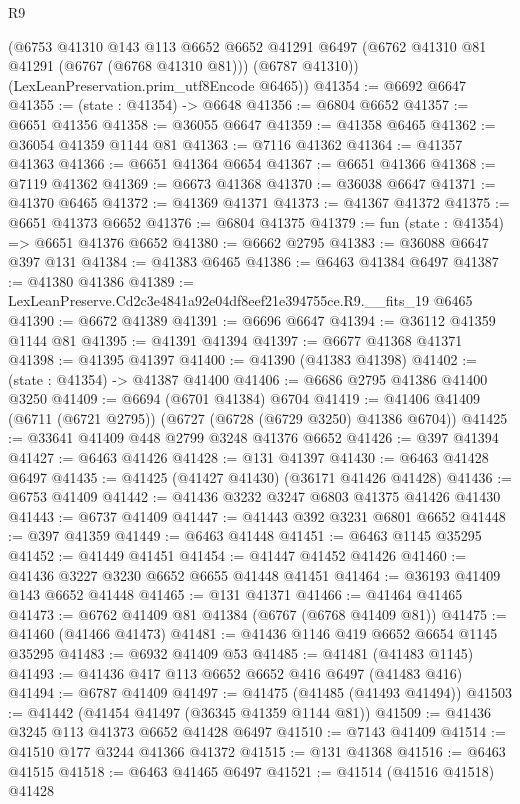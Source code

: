 \begin{lexlean}{R9}
\begin{coremodule}
      (@6753
        @41310
        @143
        @113
        @6652
        @6652
        @41291
        @6497
        (@6762 @41310 @81 @41291 (@6767 (@6768 @41310 @81)))
        (@6787 @41310))
      (LexLeanPreservation.prim_utf8Encode @6465))
@41354 := @6692 @6647
@41355 := (state : @41354) -> @6648
@41356 := @6804 @6652
@41357 := @6651 @41356
@41358 := @36055 @6647
@41359 := @41358 @6465
@41362 := @36054 @41359 @1144 @81
@41363 := @7116 @41362
@41364 := @41357 @41363
@41366 := @6651 @41364 @6654
@41367 := @6651 @41366
@41368 := @7119 @41362
@41369 := @6673 @41368
@41370 := @36038 @6647
@41371 := @41370 @6465
@41372 := @41369 @41371
@41373 := @41367 @41372
@41375 := @6651 @41373 @6652
@41376 := @6804 @41375
@41379 := fun (state : @41354) => @6651 @41376 @6652
@41380 := @6662 @2795
@41383 := @36088 @6647 @397 @131
@41384 := @41383 @6465
@41386 := @6463 @41384 @6497
@41387 := @41380 @41386
@41389 := LexLeanPreserve.Cd2c3e4841a92e04df8eef21e394755ce.R9.__fits_19 @6465
@41390 := @6672 @41389
@41391 := @6696 @6647
@41394 := @36112 @41359 @1144 @81
@41395 := @41391 @41394
@41397 := @6677 @41368 @41371
@41398 := @41395 @41397
@41400 := @41390 (@41383 @41398)
@41402 := (state : @41354) -> @41387 @41400
@41406 := @6686 @2795 @41386 @41400 @3250
@41409 := @6694 (@6701 @41384) @6704
@41419 := @41406 @41409 (@6711 (@6721 @2795)) (@6727 (@6728 (@6729 @3250) @41386 @6704))
@41425 := @33641 @41409 @448 @2799 @3248 @41376 @6652
@41426 := @397 @41394
@41427 := @6463 @41426
@41428 := @131 @41397
@41430 := @6463 @41428 @6497
@41435 := @41425 (@41427 @41430) (@36171 @41426 @41428)
@41436 := @6753 @41409
@41442 := @41436 @3232 @3247 @6803 @41375 @41426 @41430
@41443 := @6737 @41409
@41447 := @41443 @392 @3231 @6801 @6652
@41448 := @397 @41359
@41449 := @6463 @41448
@41451 := @6463 @1145 @35295
@41452 := @41449 @41451
@41454 := @41447 @41452 @41426
@41460 := @41436 @3227 @3230 @6652 @6655 @41448 @41451
@41464 := @36193 @41409 @143 @6652 @41448
@41465 := @131 @41371
@41466 := @41464 @41465
@41473 := @6762 @41409 @81 @41384 (@6767 (@6768 @41409 @81))
@41475 := @41460 (@41466 @41473)
@41481 := @41436 @1146 @419 @6652 @6654 @1145 @35295
@41483 := @6932 @41409 @53
@41485 := @41481 (@41483 @1145)
@41493 := @41436 @417 @113 @6652 @6652 @416 @6497 (@41483 @416)
@41494 := @6787 @41409
@41497 := @41475 (@41485 (@41493 @41494))
@41503 := @41442 (@41454 @41497 (@36345 @41359 @1144 @81))
@41509 := @41436 @3245 @113 @41373 @6652 @41428 @6497
@41510 := @7143 @41409
@41514 := @41510 @177 @3244 @41366 @41372
@41515 := @131 @41368
@41516 := @6463 @41515
@41518 := @6463 @41465 @6497
@41521 := @41514 (@41516 @41518) @41428

\end{coremodule}
\end{lexlean}
